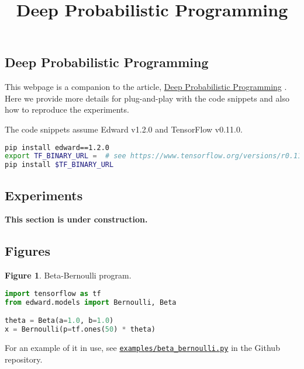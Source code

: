 \title{Deep Probabilistic Programming}

\subsection{Deep Probabilistic Programming}

This webpage is a companion to the article,
\href{https://arxiv.org/abs/1701.03757}{Deep Probabilistic Programming}
\citep{tran2017deep}
.
Here we provide more details for plug-and-play with the code snippets
and also how to reproduce the experiments.

The code snippets assume Edward v1.2.0 and TensorFlow v0.11.0.
\begin{lstlisting}[language=bash]
pip install edward==1.2.0
export TF_BINARY_URL =  # see https://www.tensorflow.org/versions/r0.11/get_started/os_setup#download-and-setup
pip install $TF_BINARY_URL
\end{lstlisting}

\subsection{Experiments}
\textbf{This section is under construction.}


\subsection{Figures}

\textbf{Figure 1}. Beta-Bernoulli program.
\begin{lstlisting}[language=python]
import tensorflow as tf
from edward.models import Bernoulli, Beta

theta = Beta(a=1.0, b=1.0)
x = Bernoulli(p=tf.ones(50) * theta)
\end{lstlisting}
For an example of it in use, see
\href{https://github.com/blei-lab/edward/blob/master/examples/beta_bernoulli.py}{\texttt{examples/beta_bernoulli.py}}
in the Github repository.

